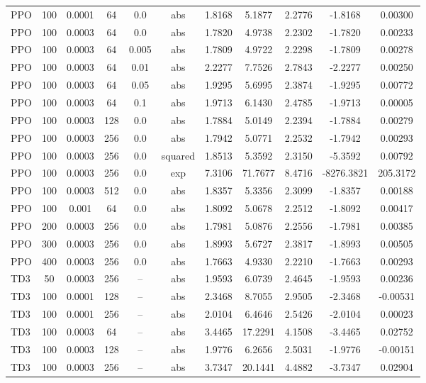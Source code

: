 \documentclass[11pt]{article}
\begin{document}
\begin{table}[h!]
\begin{tabular}{|lccccc|ccccc|}
PPO & 100 & 0.0001 & 64  & 0.0  & abs & 1.8168 & 5.1877 & 2.2776 & -1.8168 &  0.00300 \\
PPO & 100 & 0.0003 & 64  & 0.0  & abs & 1.7820 & 4.9738 & 2.2302 & -1.7820 &  0.00233 \\
PPO & 100 & 0.0003 & 64  & 0.005& abs & 1.7809 & 4.9722 & 2.2298 & -1.7809 &  0.00278 \\
PPO & 100 & 0.0003 & 64  & 0.01 & abs & 2.2277 & 7.7526 & 2.7843 & -2.2277 &  0.00250 \\
PPO & 100 & 0.0003 & 64  & 0.05 & abs & 1.9295 & 5.6995 & 2.3874 & -1.9295 &  0.00772 \\
PPO & 100 & 0.0003 & 64  & 0.1  & abs & 1.9713 & 6.1430 & 2.4785 & -1.9713 &  0.00005 \\
PPO & 100 & 0.0003 & 128 & 0.0  & abs & 1.7884 & 5.0149 & 2.2394 & -1.7884 &  0.00279 \\
PPO & 100 & 0.0003 & 256 & 0.0  & abs & 1.7942 & 5.0771 & 2.2532 & -1.7942 &  0.00293 \\
PPO & 100 & 0.0003 & 256 & 0.0  & squared & 1.8513 & 5.3592 & 2.3150 & -5.3592 & 0.00792 \\
PPO & 100 & 0.0003 & 256 & 0.0  & exp & 7.3106 & 71.7677 & 8.4716 & -8276.3821 & 205.3172 \\
PPO & 100 & 0.0003 & 512 & 0.0  & abs & 1.8357 & 5.3356 & 2.3099 & -1.8357 &  0.00188 \\
PPO & 100 & 0.001  & 64  & 0.0  & abs & 1.8092 & 5.0678 & 2.2512 & -1.8092 &  0.00417 \\
PPO & 200 & 0.0003 & 256 & 0.0  & abs & 1.7981 & 5.0876 & 2.2556 & -1.7981 &  0.00385 \\
PPO & 300 & 0.0003 & 256 & 0.0  & abs & 1.8993 & 5.6727 & 2.3817 & -1.8993 &  0.00505 \\
PPO & 400 & 0.0003 & 256 & 0.0  & abs & 1.7663 & 4.9330 & 2.2210 & -1.7663 &  0.00293 \\
TD3 & 50  & 0.0003 & 256 & --   & abs & 1.9593 & 6.0739 & 2.4645 & -1.9593 &  0.00236 \\
TD3 & 100 & 0.0001 & 128 & --   & abs & 2.3468 & 8.7055 & 2.9505 & -2.3468 & -0.00531 \\
TD3 & 100 & 0.0001 & 256 & --   & abs & 2.0104 & 6.4646 & 2.5426 & -2.0104 &  0.00023 \\
TD3 & 100 & 0.0003 & 64  & --   & abs & 3.4465 & 17.2291 & 4.1508 & -3.4465 &  0.02752 \\
TD3 & 100 & 0.0003 & 128 & --   & abs & 1.9776 & 6.2656 & 2.5031 & -1.9776 & -0.00151 \\
TD3 & 100 & 0.0003 & 256 & --   & abs & 3.7347 & 20.1441 & 4.4882 & -3.7347 &  0.02904 \\

\end{tabular}
\end{table}
\end{document}

